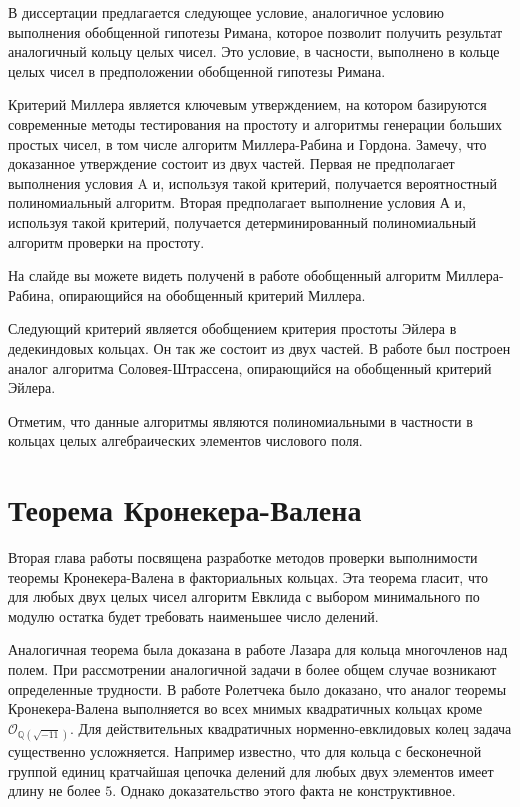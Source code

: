 \documentclass[a4paper,12pt]{article} %
\begin{document}
В диссертации предлагается следующее условие, аналогичное условию выполнения обобщенной гипотезы Римана, которое позволит получить результат аналогичный кольцу целых чисел.
Это условие, в часности, выполнено в кольце целых чисел в предположении обобщенной гипотезы Римана.

Критерий Миллера является ключевым утверждением, на котором базируются современные методы тестирования на простоту и алгоритмы генерации больших простых чисел, в том числе алгоритм Миллера-Рабина и Гордона.
Замечу, что доказанное утверждение состоит из двух частей.
Первая не предполагает выполнения условия A и, используя такой критерий, получается вероятностный полиномиальный алгоритм.
Вторая предполагает выполнение условия А и, используя такой критерий, получается детерминированный полиномиальный алгоритм проверки на простоту.

На слайде вы можете видеть полученй в работе обобщенный алгоритм Миллера-Рабина, опирающийся на обобщенный критерий Миллера.

Следующий критерий является обобщением критерия простоты Эйлера в дедекиндовых кольцах.
Он так же состоит из двух частей.
В работе был построен аналог алгоритма Соловея-Штрассена, опирающийся на обобщенный критерий Эйлера.

Отметим, что данные алгоритмы являются полиномиальными в частности в кольцах целых алгебраических элементов числового поля.

\section{Теорема Кронекера-Валена}

Вторая глава работы посвящена разработке методов проверки выполнимости теоремы Кронекера-Валена в факториальных кольцах.
Эта теорема гласит, что для любых двух целых чисел алгоритм Евклида с выбором минимального по модулю остатка будет требовать наименьшее число делений.

Аналогичная теорема была доказана в работе Лазара для кольца многочленов над полем.
При рассмотрении аналогичной задачи в более общем случае возникают определенные трудности.
В работе Ролетчека было доказано, что аналог теоремы Кронекера-Валена выполняется во всех мнимых квадратичных кольцах кроме $\mathcal{O}_{\mathbb{Q}(\sqrt{-11})}$.
Для действительных квадратичных норменно-евклидовых колец задача существенно усложняется.
Например известно, что для кольца с бесконечной группой единиц кратчайшая цепочка делений для любых двух элементов имеет длину не более $5$.
Однако доказательство этого факта не конструктивное.
\end{document}
